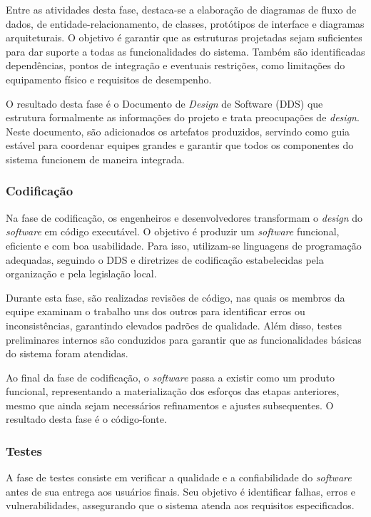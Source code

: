 Entre as atividades desta fase, destaca-se a elaboração de diagramas de fluxo de dados, de entidade-relacionamento, de classes, protótipos de interface e diagramas arquiteturais. O objetivo é garantir que as estruturas projetadas sejam suficientes para dar suporte a todas as funcionalidades do sistema. Também são identificadas dependências, pontos de integração e eventuais restrições, como limitações do equipamento físico e requisitos de desempenho.

O resultado desta fase é o Documento de \emph{Design} de Software (DDS) que estrutura formalmente as informações do projeto e trata preocupações de \emph{design}. Neste documento, são adicionados os artefatos produzidos, servindo como guia estável para coordenar equipes grandes e garantir que todos os componentes do sistema funcionem de maneira integrada.

\subsubsection{Codificação}

Na fase de codificação, os engenheiros e desenvolvedores transformam o \emph{design} do \emph{software} em código executável. O objetivo é produzir um \emph{software} funcional, eficiente e com boa usabilidade. Para isso, utilizam-se linguagens de programação adequadas, seguindo o DDS e diretrizes de codificação estabelecidas pela organização e pela legislação local.

Durante esta fase, são realizadas revisões de código, nas quais os membros da equipe examinam o trabalho uns dos outros para identificar erros ou inconsistências, garantindo elevados padrões de qualidade. Além disso, testes preliminares internos são conduzidos para garantir que as funcionalidades básicas do sistema foram atendidas.

Ao final da fase de codificação, o \emph{software} passa a existir como um produto funcional, representando a materialização dos esforços das etapas anteriores, mesmo que ainda sejam necessários refinamentos e ajustes subsequentes. O resultado desta fase é o código-fonte.

\subsubsection{Testes}

A fase de testes consiste em verificar a qualidade e a confiabilidade do \emph{software} antes de sua entrega aos usuários finais. Seu objetivo é identificar falhas, erros e vulnerabilidades, assegurando que o sistema atenda aos requisitos especificados.

